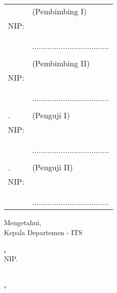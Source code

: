 \noindent
\begin{tabularx}{\textwidth}{X l}
  \advisor{}               & (Pembimbing I)                      \\
  NIP: \advisornip{}       &                                     \\
                           &                                     \\
                           &                                     \\
                           & ................................... \\
                           &                                     \\                                                      
  \coadvisor{}             & (Pembimbing II)                     \\
  NIP: \coadvisornip{}     &                                     \\
                           &                                     \\
                           &                                     \\
                           & ................................... \\
                           &                                     \\                                                      
  \examinerone{}.          & (Penguji I)                         \\
  NIP: \examineronenip{}   &                                     \\
                           &                                     \\
                           &                                     \\
                           & ................................... \\
                           &                                     \\                                                      
  \examinertwo{}.          & (Penguji II)                        \\
  NIP: \examinertwonip{}   &                                     \\
                           &                                     \\
                           &                                     \\
                           & ................................... \\                                                     
\end{tabularx}
\endgroup

\begin{center}
  Mengetahui, \\
  Kepala Departemen \department{} \facultyshort{} - ITS\\

  \vspace{8ex}

  \underline{\headofdepartment{}.} \\
  NIP. \headofdepartmentnip{}
\end{center}

\begin{center}
  \textbf{\MakeUppercase{\place{}}\\\MONTH{}, \the\year{}}
\end{center}
\endgroup
